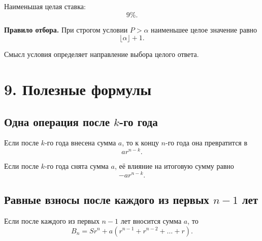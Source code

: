 \documentclass[a4paper,12pt]{article}
\newcommand{\key}[1]{\textcolor{darkaccent}{\textbf{#1}}}
\begin{document}
Наименьшая целая ставка:
\[
  \boxed{9\%}.
\]

\begin{center}
\end{center}

\key{Правило отбора.}
При строгом условии \(P>\alpha\) наименьшее целое значение равно
\[
  \lfloor\alpha\rfloor+1.
\]

Смысл условия определяет направление выбора целого ответа.

\section*{9. Полезные формулы}

\subsection*{Одна операция после \(k\)-го года}

Если после \(k\)-го года внесена сумма \(a\), то к концу \(n\)-го года
она превратится в
\[
  ar^{n-k}.
\]

Если после \(k\)-го года снята сумма \(a\), её влияние на итоговую
сумму равно
\[
  -ar^{n-k}.
\]

\subsection*{Равные взносы после каждого из первых \(n-1\) лет}

Если после каждого из первых \(n-1\) лет вносится сумма \(a\), то
\[
  B_n
  =
  Sr^n
  +
  a\left(
    r^{n-1}+r^{n-2}+\dots+r
  \right).
\]
\end{document}
